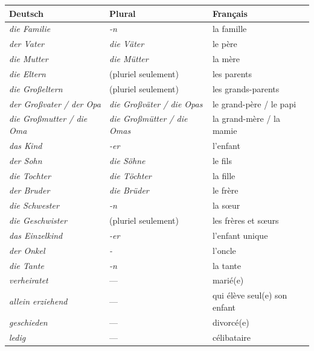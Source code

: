 \documentclass[11pt]{article}
\newcommand{\all}[1]{\ifmmode\text{\textit{#1}}\else\begingroup\selectlanguage{ngerman}\itshape #1\endgroup\fi}
\begin{document}
\begin{definition}
\begin{center}
\begin{tabularx}{\linewidth}{|l|l|X|}
\hline
\rowcolor{popblueL} Deutsch & Plural & Français \\
\hline
\all{die Familie} & \all{-n} & la famille \\
\hline
\all{der Vater} & \all{die Väter} & le père \\
\hline
\all{die Mutter} & \all{die Mütter} & la mère \\
\hline
\all{die Eltern} & (pluriel seulement) & les parents \\
\hline
\all{die Großeltern} & (pluriel seulement) & les grands-parents \\
\hline
\all{der Großvater / der Opa} & \all{die Großväter / die Opas} & le grand-père / le papi \\
\hline
\all{die Großmutter / die Oma} & \all{die Großmütter / die Omas} & la grand-mère / la mamie \\
\hline
\all{das Kind} & \all{-er} & l'enfant \\
\hline
\all{der Sohn} & \all{die Söhne} & le fils \\
\hline
\all{die Tochter} & \all{die Töchter} & la fille \\
\hline
\all{der Bruder} & \all{die Brüder} & le frère \\
\hline
\all{die Schwester} & \all{-n} & la sœur \\
\hline
\all{die Geschwister} & (pluriel seulement) & les frères et sœurs \\
\hline
\all{das Einzelkind} & \all{-er} & l'enfant unique \\
\hline
\all{der Onkel} & \all{-} & l'oncle \\
\hline
\all{die Tante} & \all{-n} & la tante \\
\hline
\all{verheiratet} & --- & marié(e) \\
\hline
\all{allein erziehend} & --- & qui élève seul(e) son enfant \\
\hline
\all{geschieden} & --- & divorcé(e) \\
\hline
\all{ledig} & --- & célibataire \\
\hline
\end{tabularx}
\end{center}
\end{definition}
\end{document}
